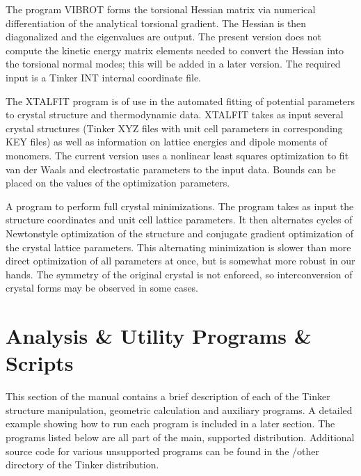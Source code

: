 \documentclass[letterpaper,11pt,english]{sphinxmanual}
\begin{document}

The program VIBROT forms the torsional Hessian matrix via numerical differentiation of the analytical torsional gradient. The Hessian is then diagonalized and the eigenvalues are output. The present version does not compute the kinetic energy matrix elements needed to convert the Hessian into the torsional normal modes; this will be added in a later version. The required input is a Tinker INT internal coordinate file.


The XTALFIT program is of use in the automated fitting of potential parameters to crystal structure and thermodynamic data. XTALFIT takes as input several crystal structures (Tinker XYZ files with unit cell parameters in corresponding KEY files) as well as information on lattice energies and dipole moments of monomers. The current version uses a nonlinear least squares optimization to fit van der Waals and electrostatic parameters to the input data. Bounds can be placed on the values of the optimization parameters.


A program to perform full crystal minimizations. The program takes as input the structure coordinates and unit cell lattice parameters. It then alternates cycles of Newton\sphinxhyphen{}style optimization of the structure and conjugate gradient optimization of the crystal lattice parameters. This alternating minimization is slower than more direct optimization of all parameters at once, but is somewhat more robust in our hands. The symmetry of the original crystal is not enforced, so interconversion of crystal forms may be observed in some cases.


\chapter{Analysis \& Utility Programs \& Scripts}
\label{\detokenize{text/analysis-programs:analysis-utility-programs-scripts}}\label{\detokenize{text/analysis-programs::doc}}
This section of the manual contains a brief description of each of the Tinker structure manipulation, geometric calculation and auxiliary programs. A detailed example showing how to run each program is included in a later section. The programs listed below are all part of the main, supported distribution. Additional source code for various unsupported programs can be found in the /other directory of the Tinker distribution.
\end{document}
